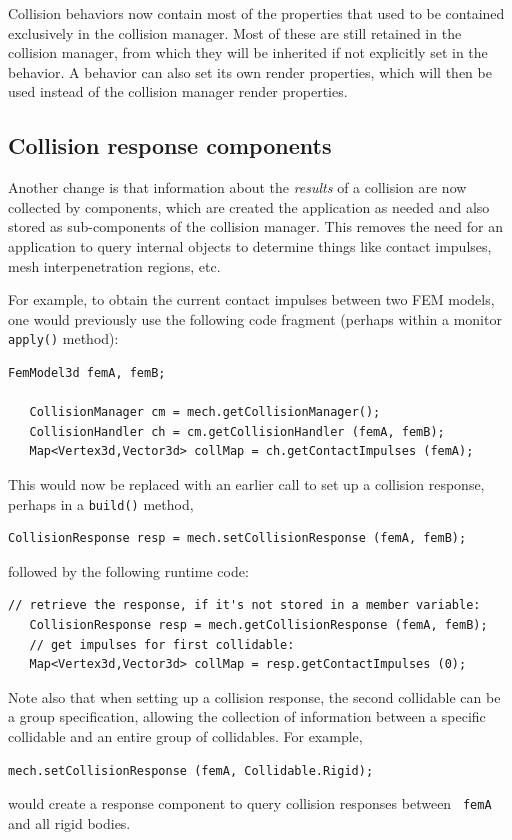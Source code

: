 \documentclass{article}
\begin{document}
Collision behaviors now contain most of the properties that used to be
contained exclusively in the collision manager. Most of these are
still retained in the collision manager, from which they will be
inherited if not explicitly set in the behavior. A behavior can also
set its own render properties, which will then be used instead of the
collision manager render properties.

\subsection*{Collision response components}

Another change is that information about the {\it results} of a
collision are now collected by
 components,
which are created the application as needed and also stored as
sub-components of the collision manager. This removes the need for an
application to query internal
 objects to
determine things like contact impulses, mesh interpenetration regions,
etc.

For example, to obtain the current contact impulses between two FEM
models, one would previously use the following code fragment (perhaps
within a monitor {\tt apply()} method):
%
\begin{lstlisting}[]
   FemModel3d femA, femB;
 
   CollisionManager cm = mech.getCollisionManager();
   CollisionHandler ch = cm.getCollisionHandler (femA, femB);
   Map<Vertex3d,Vector3d> collMap = ch.getContactImpulses (femA);
\end{lstlisting}
%
This would now be replaced with an earlier call to set up a collision
response, perhaps in a {\tt build()} method,
%
\begin{lstlisting}[]
   CollisionResponse resp = mech.setCollisionResponse (femA, femB);
\end{lstlisting}
%
followed by the following runtime code:
\begin{lstlisting}[]
   // retrieve the response, if it's not stored in a member variable:
   CollisionResponse resp = mech.getCollisionResponse (femA, femB);
   // get impulses for first collidable:
   Map<Vertex3d,Vector3d> collMap = resp.getContactImpulses (0);
\end{lstlisting}
%
Note also that when setting up a collision response, the second
collidable can be a group specification, allowing the collection of
information between a specific collidable and an entire
group of collidables.  For example,
%
\begin{lstlisting}[]
   mech.setCollisionResponse (femA, Collidable.Rigid);
\end{lstlisting}
%
would create a response component to query collision responses between {\tt
femA} and all rigid bodies.
\end{document}

